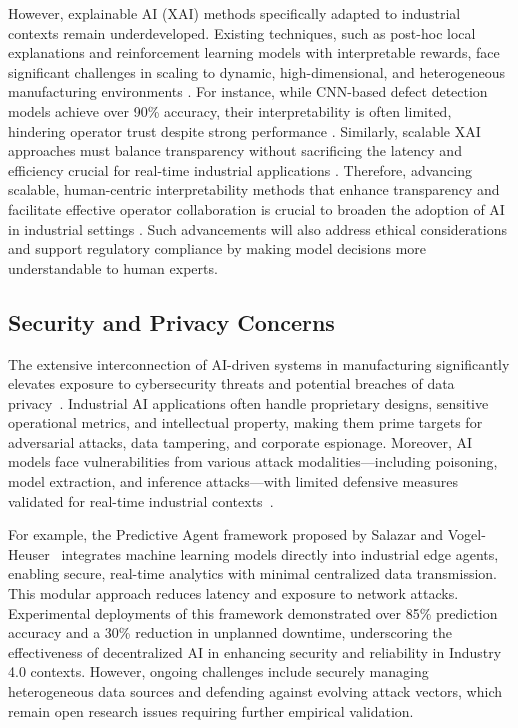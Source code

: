 \documentclass[sigconf]{acmart}
\begin{document}
However, explainable AI (XAI) methods specifically adapted to industrial contexts remain underdeveloped. Existing techniques, such as post-hoc local explanations and reinforcement learning models with interpretable rewards, face significant challenges in scaling to dynamic, high-dimensional, and heterogeneous manufacturing environments \cite{ref14,ref36}. For instance, while CNN-based defect detection models achieve over 90\% accuracy, their interpretability is often limited, hindering operator trust despite strong performance \cite{ref34}. Similarly, scalable XAI approaches must balance transparency without sacrificing the latency and efficiency crucial for real-time industrial applications \cite{ref36}. Therefore, advancing scalable, human-centric interpretability methods that enhance transparency and facilitate effective operator collaboration is crucial to broaden the adoption of AI in industrial settings \cite{ref14}. Such advancements will also address ethical considerations and support regulatory compliance by making model decisions more understandable to human experts.

\subsection{Security and Privacy Concerns}

The extensive interconnection of AI-driven systems in manufacturing significantly elevates exposure to cybersecurity threats and potential breaches of data privacy~\cite{ref13,ref37}. Industrial AI applications often handle proprietary designs, sensitive operational metrics, and intellectual property, making them prime targets for adversarial attacks, data tampering, and corporate espionage. Moreover, AI models face vulnerabilities from various attack modalities—including poisoning, model extraction, and inference attacks—with limited defensive measures validated for real-time industrial contexts~\cite{ref37,ref41}.

For example, the Predictive Agent framework proposed by Salazar and Vogel-Heuser~\cite{ref37} integrates machine learning models directly into industrial edge agents, enabling secure, real-time analytics with minimal centralized data transmission. This modular approach reduces latency and exposure to network attacks. Experimental deployments of this framework demonstrated over 85\% prediction accuracy and a 30\% reduction in unplanned downtime, underscoring the effectiveness of decentralized AI in enhancing security and reliability in Industry 4.0 contexts. However, ongoing challenges include securely managing heterogeneous data sources and defending against evolving attack vectors, which remain open research issues requiring further empirical validation.
\end{document}
